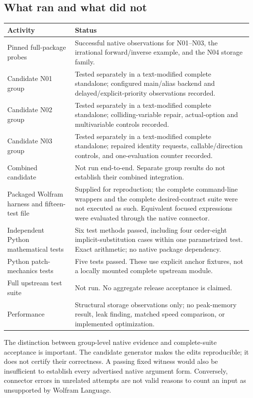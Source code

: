 \documentclass[11pt]{article}
\begin{document}
\subsection{What ran and what did not}
\begin{longtable}{@{}P{5.0cm}P{9.8cm}@{}}
\toprule
Activity & Status\\ \midrule
\endhead
Pinned full-package probes & Successful native observations for N01--N03, the irrational forward/inverse example, and the N04 storage family.\\[0.5em]
Candidate N01 group & Tested separately in a text-modified complete standalone; configured main/alias backend and delayed/explicit-priority observations recorded.\\[0.5em]
Candidate N02 group & Tested separately in a text-modified complete standalone; colliding-variable repair, actual-option and multivariable controls recorded.\\[0.5em]
Candidate N03 group & Tested separately in a text-modified complete standalone; repaired identity requests, callable/direction controls, and one-evaluation counter recorded.\\[0.5em]
Combined candidate & Not run end-to-end. Separate group results do not establish their combined integration.\\[0.5em]
Packaged Wolfram harness and fifteen-test file & Supplied for reproduction; the complete command-line wrappers and the complete desired-contract suite were not executed as such. Equivalent focused expressions were evaluated through the native connector.\\[0.5em]
Independent Python mathematical tests & Six test methods passed, including four order-eight implicit-substitution cases within one parametrized test. Exact arithmetic; no native package dependency.\\[0.5em]
Python patch-mechanics tests & Five tests passed. These use explicit anchor fixtures, not a locally mounted complete upstream module.\\[0.5em]
Full upstream test suite & Not run. No aggregate release acceptance is claimed.\\[0.5em]
Performance & Structural storage observations only; no peak-memory result, leak finding, matched speed comparison, or implemented optimization.\\
\bottomrule
\end{longtable}

The distinction between group-level native evidence and complete-suite acceptance is important. The candidate generator makes the edits reproducible; it does not certify their correctness. A passing fixed witness would also be insufficient to establish every advertised native argument form. Conversely, connector errors in unrelated attempts are not valid reasons to count an input as unsupported by Wolfram Language.
\end{document}
